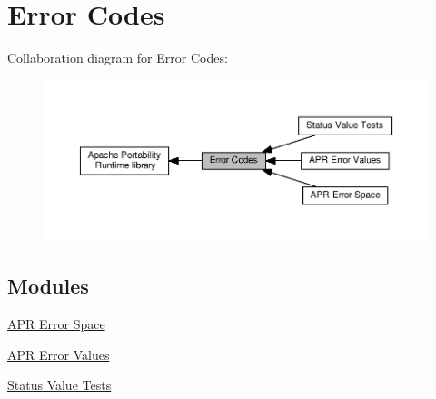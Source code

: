 \hypertarget{group__apr__errno}{}\section{Error Codes}
\label{group__apr__errno}
Collaboration diagram for Error Codes\+:
\nopagebreak
\begin{figure}[H]
\begin{center}
\leavevmode
\includegraphics[width=350pt]{group__apr__errno}
\end{center}
\end{figure}
\subsection*{Modules}
\begin{DoxyCompactItemize}
\item 
\hyperlink{group__APR__ERROR__map}{A\+P\+R Error Space}
\item 
\hyperlink{group__APR__Error}{A\+P\+R Error Values}
\item 
\hyperlink{group__APR__STATUS__IS}{Status Value Tests}
\end{DoxyCompactItemize}
